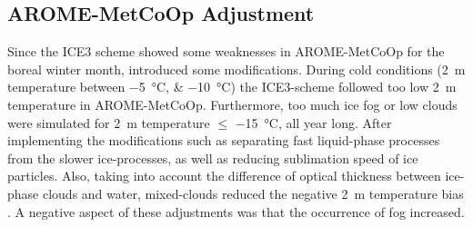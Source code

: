 
%
\subsection{AROME-MetCoOp Adjustment}\label{sec:AROME:adjustment}
Since the ICE3 scheme showed some weaknesses in AROME-MetCoOp for the boreal winter month, \cite{muller_arome-metcoop:_2017} introduced some modifications. 
During cold conditions (\SI{2}{\metre} temperature between \SIlist{-5;-10}{\celsius}) the ICE3-scheme followed too low \SI{2}{\metre} temperature in AROME-MetCoOp. Furthermore, too much ice fog or low clouds were simulated for \SI{2}{\metre} temperature $\le$ \SI{-15}{\celsius}, all year long. After implementing the modifications such as separating fast liquid-phase processes from the slower ice-processes, as well as reducing sublimation speed of ice particles. Also, taking into account the difference of optical thickness between ice-phase clouds and water, mixed-clouds reduced the negative \SI{2}{\metre} temperature bias \citep{muller_arome-metcoop:_2017}. %
A negative aspect of these adjustments was that the occurrence of fog increased.%

